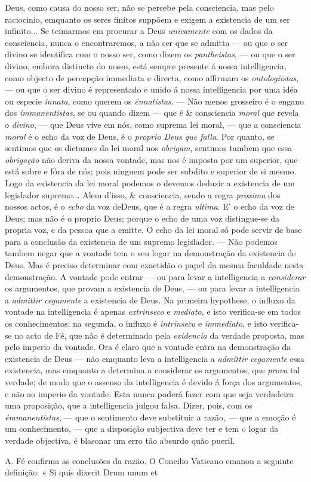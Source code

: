 Deus, como causa do nosso ser, não se percebe pela consciencia, mas pelo raciocinio, emquanto os seres finitos suppõem e exigem a existencia de um ser infinito... Se teimarmos em procurar a Deus \emph{unicamente} com os dados da consciencia, nunca o encontraremos, a não ser que se admitta --- ou que o ser divino se identifica com o nosso ser, como dizem os \emph{pantheistas}, --- ou que o ser divino, embora distincto do nosso, está sempre presente á nossa intelligencia, como objecto de percepção immediata e directa, como affirmam os \emph{ontologíistas}, --- ou que o ser divino é representado e unido á nossa intelligencia por uma idéa ou especie \emph{innata}, como querem os \emph{énnatistas}. --- Não menos grosseiro é o engano dos \emph{immanentistas}, se ou quando dizem --- que é \& consciencia \emph{moral} que revela o \emph{divino}, --- que Deus vive em nós, como suprema lei moral, --- que a consciencia \emph{moral} é o echo da voz de Deus, é o \emph{proprio Deus que falla}. Por quanto, se sentimos que os dictames da lei moral nos \emph{obrigam}, sentimos tambem que essa \emph{obrigação} não deriva da nossa vontade, mas nos é imposta por um superior, que está sobre e fóra de nós; pois ninguem pode ser subdito e superior de si mesmo. Logo da existencia da lei moral podemos o devemos deduzir a existencia de um legislador supremo... Alem d'isso, \& consciencia, sendo a regra \emph{proxima} dos nossos actos, é o \emph{echo} da voz deDeus, que é a regra \emph{ultima}. E' o echo da voz de Deus; mas não é o proprio Deus; porque o echo de uma voz distingue-se da propria voz, e da pessoa que a emitte. O echo da lei moral só pode servir de base para a conclusão da existencia de um supremo legislador. --- Não podemos tambem negar que a vontade tem o seu logar na demonstração da existencia de Deus. Mas é preciso determinar com exactidão o papel da mesma faculdade nesta demonstração. A vontade pode entrar --- ou para levar a intelligencia a \emph{considerar} os argumentos, que provam a existencia de Deus, --- ou para levar a intelligencia a \emph{admittir cegamente} a existencia de Deus. Na primeira hypothese, o influxo da vontade na intelligencia é apenas \emph{extrinseco} e \emph{mediato}, e isto verifica-se em todos os conhecimentos; na segunda, o influxo é \emph{intrinseco} e \emph{immediato}, e isto verifica-se no acto de Fé, que não é determinado pela \emph{evidencia} da verdade proposta, mas pelo imperio da vontade. Ora é claro que a vontade entra na demonstração da existencia de Deus --- não emquanto leva a intelligencia a \emph{admittir cegamente} essa existencia, mas emquanto a determina a considerar os argumentos, que \emph{prova} tal verdade; de modo que o assenso da intelligencia é devido á força dos argumentos, e não ao imperio da vontade. Esta nunca poderá fazer com que seja verdadeira uma proposição, que a intelligencia julgou falsa. Dizer, pois, com os \emph{émmanentistas}, --- que o sentimento deve substituir a razão, --- que a emoção é um conhecimento, --- que a disposição subjectiva deve ter e tem o logar da verdade objectiva, é blasonar um erro tão absurdo quão pueril.\par A. Fé confirma as conclusões da razão. O Concilio Vaticano emanou a seguinte definição: « Si quis dixerit Drum unum et 
